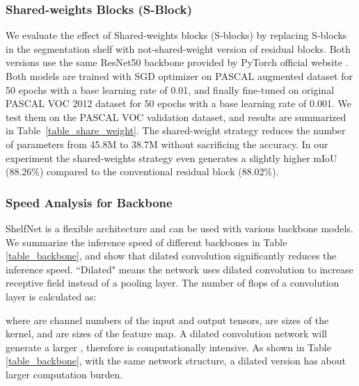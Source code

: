 \documentclass[10pt,twocolumn,letterpaper]{article}
\begin{document}
\subsubsection{Shared-weights Blocks (S-Block)}
\label{sec_share_weight}
We evaluate the effect of Shared-weights blocks (S-blocks) by replacing S-blocks in the segmentation shelf with not-shared-weight version of residual blocks. Both versions use the same ResNet50 backbone provided by PyTorch official website \cite{paszke2017automatic}. Both models are trained with SGD optimizer on PASCAL augmented dataset for 50 epochs with a base learning rate of 0.01, and finally fine-tuned on original PASCAL VOC 2012 dataset for 50 epochs with a base learning rate of 0.001. We test them on the PASCAL VOC validation dataset, and results are summarized in Table~\ref{table_share_weight}. The shared-weight strategy reduces the number of parameters from 45.8M to 38.7M without sacrificing the accuracy.  In our experiment the shared-weights strategy even generates a slightly higher mIoU (88.26\%) compared to the conventional residual block (88.02\%).





\subsubsection{Speed Analysis for Backbone}
ShelfNet is a flexible architecture and can be used with various backbone models. We summarize the inference speed of different backbones in Table \ref{table_backbone}, and show that dilated convolution significantly reduces the inference speed. 
``Dilated" means the network uses dilated convolution to increase receptive field instead of a pooling layer. The number of flops of a convolution layer is calculated as:

where  are channel numbers of the input and output tensors,  are sizes of the kernel, and  are sizes of the feature map. A dilated convolution network will generate a larger , therefore is computationally intensive. As shown in Table \ref{table_backbone}, with the same network structure, a dilated version has about  larger computation burden.
\end{document}
